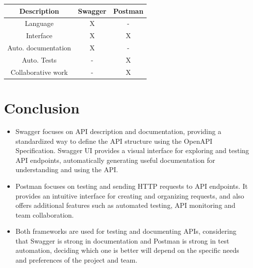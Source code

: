 \documentclass[twoside,twocolumn]{article}
\begin{document}
\begin{tabular}{| c | c | c |}
\hline
Description & Swagger & Postman \\ \hline
Language & X & -  \\
Interface & X & X  \\
Auto. documentation & X & -  \\
Auto. Tests & - & X  \\

Collaborative work & - & X  \\ \hline
\end{tabular}


\section{Conclusion}
\begin{itemize}	
	\item  Swagger focuses on API description and documentation, providing a standardized way to define the API structure using the OpenAPI Specification. Swagger UI provides a visual interface for exploring and testing API endpoints, automatically generating useful documentation for understanding and using the API.
	\item Postman focuses on testing and sending HTTP requests to API endpoints. It provides an intuitive interface for creating and organizing requests, and also offers additional features such as automated testing, API monitoring and team collaboration.
	\item Both frameworks are used for testing and documenting APIs, considering that Swagger is strong in documentation and Postman is strong in test automation, deciding which one is better will depend on the specific needs and preferences of the project and team.
\end{itemize} 
\end{document}
